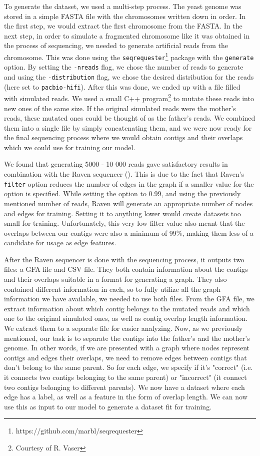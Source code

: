 \documentclass[times, utf8, diplomski, english]{fer_eng}
\begin{document}
To generate the dataset, we used a multi-step process. The yeast genome was stored in a simple FASTA file with the chromosomes written down in order. In the first step, we would extract the first chromosome from the FASTA. In the next step, in order to simulate a fragmented chromosome like it was obtained in the process of sequencing, we needed to generate artificial reads from the chromosome. This was done using the \texttt{seqrequester}\footnote{https://github.com/marbl/seqrequester} package with the \texttt{generate} option. By setting the \texttt{-nreads} flag, we chose the number of reads to generate and using the \texttt{-distribution} flag, we chose the desired distribution for the reads (here set to \texttt{pacbio-hifi}). After this was done, we ended up with a file filled with simulated reads. We used a small C++ program\footnote{Courtesy of R. Vaser} to mutate these reads into new ones of the same size. If the original simulated reads were the mother's reads, these mutated ones could be thought of as the father's reads. We combined them into a single file by simply concatenating them, and we were now ready for the final sequencing process where we would obtain contigs and their overlaps which we could use for training our model.

We found that generating 5000 - 10 000 reads gave satisfactory results in combination with the Raven sequencer (\cite{Vaser}). This is due to the fact that Raven's \texttt{filter} option reduces the number of edges in the graph if a smaller value for the option is specified. While setting the option to 0.99, and using the previously mentioned number of reads, Raven will generate an appropriate number of nodes and edges for training. Setting it to anything lower would create datasets too small for training. Unfortunately, this very low filter value also meant that the overlaps between our contigs were also a minimum of 99\%, making them less of a candidate for usage as edge features.

After the Raven sequencer is done with the sequencing process, it outputs two files: a GFA file and CSV file. They both contain information about the contigs and their overlaps suitable in a format for generating a graph. They also contained different information in each, so to fully utilize all the graph information we have available, we needed to use both files. From the GFA file, we extract information about which contig belongs to the mutated reads and which one to the original simulated ones, as well as contig overlap length information. We extract them to a separate file for easier analyzing. Now, as we previously mentioned, our task is to separate the contigs into the father's and the mother's genome. In other words, if we are presented with a graph where nodes represent contigs and edges their overlaps, we need to remove edges between contigs that don't belong to the same parent. So for each edge, we specify if it's "correct" (i.e. it connects two contigs belonging to the same parent) or "incorrect" (it connect two contigs belonging to different parents). We now have a dataset where each edge has a label, as well as a feature in the form of overlap length. We can now use this as input to our model to generate a dataset fit for training.
\end{document}
